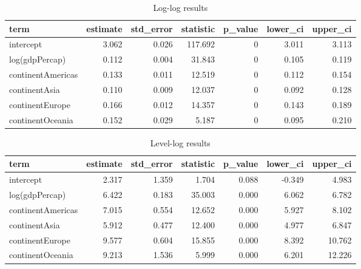 \documentclass[
]{book}
\begin{document}
\begin{table}

\caption{\label{tab:loglogtab}Log-log results}
\centering
\begin{tabular}[t]{l|r|r|r|r|r|r}
\hline
term & estimate & std\_error & statistic & p\_value & lower\_ci & upper\_ci\\
\hline
intercept & 3.062 & 0.026 & 117.692 & 0 & 3.011 & 3.113\\
\hline
log(gdpPercap) & 0.112 & 0.004 & 31.843 & 0 & 0.105 & 0.119\\
\hline
continentAmericas & 0.133 & 0.011 & 12.519 & 0 & 0.112 & 0.154\\
\hline
continentAsia & 0.110 & 0.009 & 12.037 & 0 & 0.092 & 0.128\\
\hline
continentEurope & 0.166 & 0.012 & 14.357 & 0 & 0.143 & 0.189\\
\hline
continentOceania & 0.152 & 0.029 & 5.187 & 0 & 0.095 & 0.210\\
\hline
\end{tabular}
\end{table}

\begin{table}

\caption{\label{tab:levlogtab}Level-log results}
\centering
\begin{tabular}[t]{l|r|r|r|r|r|r}
\hline
term & estimate & std\_error & statistic & p\_value & lower\_ci & upper\_ci\\
\hline
intercept & 2.317 & 1.359 & 1.704 & 0.088 & -0.349 & 4.983\\
\hline
log(gdpPercap) & 6.422 & 0.183 & 35.003 & 0.000 & 6.062 & 6.782\\
\hline
continentAmericas & 7.015 & 0.554 & 12.652 & 0.000 & 5.927 & 8.102\\
\hline
continentAsia & 5.912 & 0.477 & 12.400 & 0.000 & 4.977 & 6.847\\
\hline
continentEurope & 9.577 & 0.604 & 15.855 & 0.000 & 8.392 & 10.762\\
\hline
continentOceania & 9.213 & 1.536 & 5.999 & 0.000 & 6.201 & 12.226\\
\hline
\end{tabular}
\end{table}
\end{document}
